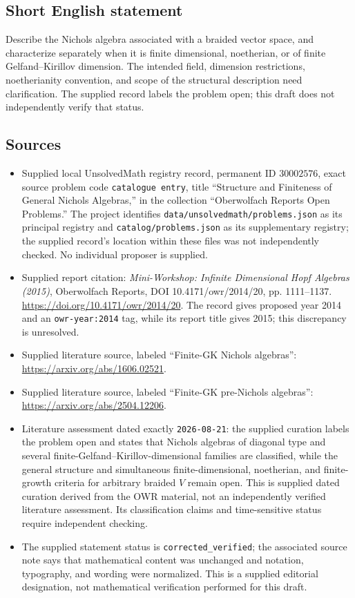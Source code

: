 \documentclass[11pt]{article}
\begin{document}
\subsection{Short English statement}
Describe the Nichols algebra associated with a braided vector space, and characterize separately when it is finite dimensional, noetherian, or of finite Gelfand--Kirillov dimension. The intended field, dimension restrictions, noetherianity convention, and scope of the structural description need clarification. The supplied record labels the problem open; this draft does not independently verify that status.
\subsection{Sources}
\begin{itemize}
\item Supplied local UnsolvedMath registry record, permanent ID \(30002576\), exact source problem code \texttt{catalogue entry}, title ``Structure and Finiteness of General Nichols Algebras,'' in the collection ``Oberwolfach Reports Open Problems.'' The project identifies \texttt{data/unsolvedmath/problems.json} as its principal registry and \texttt{catalog/problems.json} as its supplementary registry; the supplied record's location within these files was not independently checked. No individual proposer is supplied.
\item Supplied report citation: \emph{Mini-Workshop: Infinite Dimensional Hopf Algebras (2015)}, Oberwolfach Reports, DOI 10.4171/owr/2014/20, pp. 1111--1137. \url{https://doi.org/10.4171/owr/2014/20}. The record gives proposed year 2014 and an \texttt{owr-year:2014} tag, while its report title gives 2015; this discrepancy is unresolved.
\item Supplied literature source, labeled ``Finite-GK Nichols algebras'': \url{https://arxiv.org/abs/1606.02521}.
\item Supplied literature source, labeled ``Finite-GK pre-Nichols algebras'': \url{https://arxiv.org/abs/2504.12206}.
\item Literature assessment dated exactly \texttt{2026-08-21}: the supplied curation labels the problem open and states that Nichols algebras of diagonal type and several finite-Gelfand--Kirillov-dimensional families are classified, while the general structure and simultaneous finite-dimensional, noetherian, and finite-growth criteria for arbitrary braided \(V\) remain open. This is supplied dated curation derived from the OWR material, not an independently verified literature assessment. Its classification claims and time-sensitive status require independent checking.
\item The supplied statement status is \texttt{corrected\_verified}; the associated source note says that mathematical content was unchanged and notation, typography, and wording were normalized. This is a supplied editorial designation, not mathematical verification performed for this draft.
\end{itemize}
\end{document}
